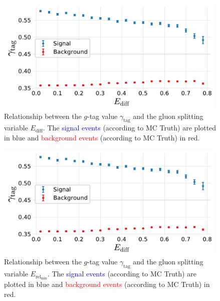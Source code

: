 \begin{figure}
  \centerfloat
  \includegraphics[width=0.99\textwidth, trim=0 0 0 0, clip, page=1]{figures/quarks/gtag-g_splitting_gtag_errorbar-down_sample=1.00-ML_vars=vertex-selection=b-ejet_min=4-n_iter_RS_lgb=99-n_iter_RS_xgb=9-cdot_cut=0.90-version=19-njet=4.pdf}
  \caption[Relationship Between the $g$-Tag Value $\gamma_\mathrm{tag}$ and the Gluon Splitting Variable $E_\mathrm{diff}$]
          {Relationship between the $g$-tag value $\gamma_\mathrm{tag}$ and the gluon splitting variable $E_\mathrm{diff}$. The \textcolor{blue}{signal events} (according to MC Truth) are plotted in blue and \textcolor{red}{background events} (according to MC Truth) in red. 
          } 
  \label{fig:q:gtag_gluon_splitting_variable_E_diff}
\end{figure}
\begin{figure}
  \centerfloat
  \includegraphics[width=0.99\textwidth, trim=0 0 0 0, clip, page=2]{figures/quarks/gtag-g_splitting_gtag_errorbar-down_sample=1.00-ML_vars=vertex-selection=b-ejet_min=4-n_iter_RS_lgb=99-n_iter_RS_xgb=9-cdot_cut=0.90-version=19-njet=4.pdf}
  \caption[Relationship Between the $g$-Tag Value $\gamma_\mathrm{tag}$ and the Gluon Splitting Variable $E_{\mathrm{rel}_\mathrm{min}}$]
          {Relationship between the $g$-tag value $\gamma_\mathrm{tag}$ and the gluon splitting variable $E_{\mathrm{rel}_\mathrm{min}}$. The \textcolor{blue}{signal events} (according to MC Truth) are plotted in blue and \textcolor{red}{background events} (according to MC Truth) in red. 
          } 
  \label{fig:q:gtag_gluon_splitting_variable_E_rel_min}
\end{figure}
